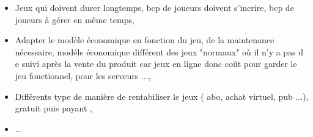 \documentclass[11pt,a4paper]{article}
\begin{document}
	
  \begin{itemize}
  \renewcommand{\labelitemi}{$\Rightarrow$}
	\item Jeux qui doivent durer longtemps, bcp de joueurs doivent s'incrire, bcp de joueurs à gérer en même temps,
	\item Adapter le modèle économique en fonction du jeu, de la maintenance nécessaire, modéle économique différent des jeux "normaux" où il n'y a pas d e suivi après la vente du produit car jeux en ligne donc coût pour garder le jeu fonctionnel, pour les serveurs ...,
	\item Différents type de manière de rentabiliser le jeux ( abo, achat virtuel, pub ...), gratuit puis payant , 
	\item ...
  \end{itemize}
\end{document}
